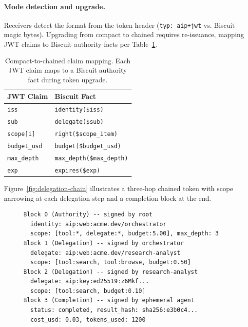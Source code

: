 \documentclass[11pt,a4paper]{article}
\begin{document}
\paragraph{Mode detection and upgrade.} Receivers detect the format from the token header (\texttt{typ: aip+jwt} vs. Biscuit magic bytes). Upgrading from compact to chained requires re-issuance, mapping JWT claims to Biscuit authority facts per Table~\ref{tab:claim-map}.

\begin{table}[t]
\centering
\caption{Compact-to-chained claim mapping. Each JWT claim maps to a Biscuit authority fact during token upgrade.}
\label{tab:claim-map}
\footnotesize
\begin{tabular}{@{}ll@{}}
\toprule
\textbf{JWT Claim} & \textbf{Biscuit Fact} \\
\midrule
\texttt{iss} & \texttt{identity(\$iss)} \\
\texttt{sub} & \texttt{delegate(\$sub)} \\
\texttt{scope[i]} & \texttt{right(\$scope\_item)} \\
\texttt{budget\_usd} & \texttt{budget(\$budget\_usd)} \\
\texttt{max\_depth} & \texttt{max\_depth(\$max\_depth)} \\
\texttt{exp} & \texttt{expires(\$exp)} \\
\bottomrule
\end{tabular}
\end{table}

Figure~\ref{fig:delegation-chain} illustrates a three-hop chained token with scope narrowing at each delegation step and a completion block at the end.

\begin{figure}[t]
\begin{lstlisting}[style=protocol,caption={Three-hop delegation chain with scope narrowing and completion block.},label={fig:delegation-chain}]
Block 0 (Authority) -- signed by root
  identity: aip:web:acme.dev/orchestrator
  scope: [tool:*, delegate:*, budget:5.00], max_depth: 3
Block 1 (Delegation) -- signed by orchestrator
  delegate: aip:web:acme.dev/research-analyst
  scope: [tool:search, tool:browse, budget:0.50]
Block 2 (Delegation) -- signed by research-analyst
  delegate: aip:key:ed25519:z6Mkf...
  scope: [tool:search, budget:0.10]
Block 3 (Completion) -- signed by ephemeral agent
  status: completed, result_hash: sha256:e3b0c4...
  cost_usd: 0.03, tokens_used: 1200
\end{lstlisting}
\end{figure}
\end{document}
